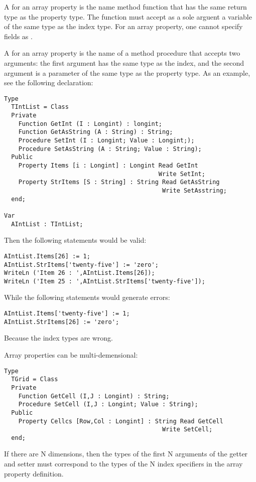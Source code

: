 A  for an array property is the name method function
that has the same return type as the property type.
The function must accept as a sole arguent a variable of the same type as
the index type. For an array property, one cannot specify fields as .

A  for an array property is the name of a method
procedure that accepts two arguments: the first argument has the same
type as the index, and the second argument is a parameter of the same
type as the property type.
As an example, see the following declaration:
\begin{verbatim}
Type 
  TIntList = Class
  Private
    Function GetInt (I : Longint) : longint;
    Function GetAsString (A : String) : String;
    Procedure SetInt (I : Longint; Value : Longint;);
    Procedure SetAsString (A : String; Value : String);
  Public
    Property Items [i : Longint] : Longint Read GetInt
                                           Write SetInt;
    Property StrItems [S : String] : String Read GetAsString
                                            Write SetAsstring;
  end;

Var 
  AIntList : TIntList;
\end{verbatim}
Then the following statements would be valid:
\begin{verbatim}
AIntList.Items[26] := 1;
AIntList.StrItems['twenty-five'] := 'zero';
WriteLn ('Item 26 : ',AIntList.Items[26]);
WriteLn ('Item 25 : ',AIntList.StrItems['twenty-five']);
\end{verbatim}
While the following statements would generate errors:
\begin{verbatim}
AIntList.Items['twenty-five'] := 1;
AIntList.StrItems[26] := 'zero';
\end{verbatim}
Because the index types are wrong.

Array properties can be multi-demensional:
\begin{verbatim}
Type 
  TGrid = Class
  Private
    Function GetCell (I,J : Longint) : String;
    Procedure SetCell (I,J : Longint; Value : String);
  Public
    Property Cellcs [Row,Col : Longint] : String Read GetCell
                                            Write SetCell;
  end;
\end{verbatim}
If there are N dimensions, then the types of the first N arguments of the getter and 
setter must correspond to the types of the N index specifiers in the array property definition.



